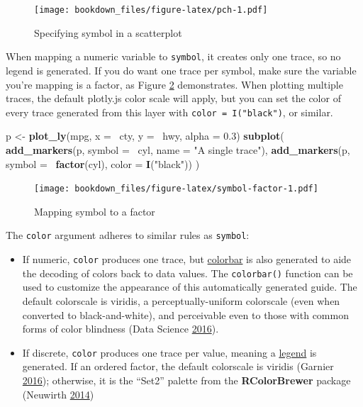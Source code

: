 \documentclass[12pt,]{isuthesis}
\newenvironment{Shaded}{\begin{snugshade}}{\end{snugshade}}
\newcommand{\KeywordTok}[1]{\textcolor[rgb]{0.13,0.29,0.53}{\textbf{{#1}}}}
\newcommand{\DataTypeTok}[1]{\textcolor[rgb]{0.13,0.29,0.53}{{#1}}}
\newcommand{\FloatTok}[1]{\textcolor[rgb]{0.00,0.00,0.81}{{#1}}}
\newcommand{\StringTok}[1]{\textcolor[rgb]{0.31,0.60,0.02}{{#1}}}
\newcommand{\NormalTok}[1]{{#1}}
\begin{document}
\begin{figure}[htbp]
\centering
\texttt{[image: bookdown\_files/figure-latex/pch-1.pdf]}
\caption{\label{fig:pch}Specifying symbol in a scatterplot}
\end{figure}

When mapping a numeric variable to \texttt{symbol}, it creates only one
trace, so no legend is generated. If you do want one trace per symbol,
make sure the variable you're mapping is a factor, as Figure
\ref{fig:symbol-factor} demonstrates. When plotting multiple traces, the
default plotly.js color scale will apply, but you can set the color of
every trace generated from this layer with
\texttt{color\ =\ I("black")}, or similar.

\begin{Shaded}
\begin{Highlighting}[]
\NormalTok{p <-}\StringTok{ }\KeywordTok{plot_ly}\NormalTok{(mpg, }\DataTypeTok{x =} \NormalTok{~cty, }\DataTypeTok{y =} \NormalTok{~hwy, }\DataTypeTok{alpha =} \FloatTok{0.3}\NormalTok{) }
\KeywordTok{subplot}\NormalTok{(}
  \KeywordTok{add_markers}\NormalTok{(p, }\DataTypeTok{symbol =} \NormalTok{~cyl, }\DataTypeTok{name =} \StringTok{"A single trace"}\NormalTok{),}
  \KeywordTok{add_markers}\NormalTok{(p, }\DataTypeTok{symbol =} \NormalTok{~}\KeywordTok{factor}\NormalTok{(cyl), }\DataTypeTok{color =} \KeywordTok{I}\NormalTok{(}\StringTok{"black"}\NormalTok{))}
\NormalTok{)}
\end{Highlighting}
\end{Shaded}

\begin{figure}[htbp]
\centering
\texttt{[image: bookdown\_files/figure-latex/symbol-factor-1.pdf]}
\caption{\label{fig:symbol-factor}Mapping symbol to a factor}
\end{figure}

The \texttt{color} argument adheres to similar rules as \texttt{symbol}:

\begin{itemize}
\item
  If numeric, \texttt{color} produces one trace, but
  \href{https://plot.ly/r/reference/\#scatter-marker-colorbar}{colorbar}
  is also generated to aide the decoding of colors back to data values.
  The \texttt{colorbar()} function can be used to customize the
  appearance of this automatically generated guide. The default
  colorscale is viridis, a perceptually-uniform colorscale (even when
  converted to black-and-white), and perceivable even to those with
  common forms of color blindness (Data Science
  \protect\hyperlink{ref-viridis}{2016}).
\item
  If discrete, \texttt{color} produces one trace per value, meaning a
  \href{https://plot.ly/r/reference/\#layout-legend}{legend} is
  generated. If an ordered factor, the default colorscale is viridis
  (Garnier \protect\hyperlink{ref-viridisLite}{2016}); otherwise, it is
  the ``Set2'' palette from the \textbf{RColorBrewer} package (Neuwirth
  \protect\hyperlink{ref-RColorBrewer}{2014})
\end{itemize}
\end{document}
